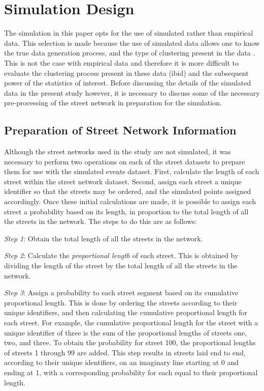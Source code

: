 \documentclass[12pt, letterpaper]{article}
\begin{document}
\section{Simulation Design}
The simulation in this paper opts for the use of simulated rather than empirical data. This selection is made because the use of simulated data allows one to know the true data generation process, and the type of clustering present in the data  \citep{kulldorff2006cancer}. This is not the case with empirical data and therefore it is more difficult to evaluate the clustering process present in these data (ibid) and the subsequent power of the statistics of interest. Before discussing the details of the simulated data in the present study however, it is necessary to discuss some of the necessary pre-processing of the street network in preparation for the simulation.

\subsection{Preparation of Street Network Information}
Although the street networks used in the study are not simulated, it was necessary to perform two operations on each of the street datasets to prepare them for use with the simulated events dataset. First, calculate the length of each street within the street network dataset. Second, assign each street a unique identifier so that the streets may be ordered, and the simulated points assigned accordingly. Once these initial calculations are made, it is possible to assign each street a probability based on its length, in proportion to the total length of all the streets in the network. The steps to do this are as follows:

\emph{Step 1}: Obtain the total length of all the streets in the network.

\emph{Step 2}: Calculate the \emph{proportional length} of each street. This is obtained by dividing the length of the street by the total length of all the streets in the network.

\emph{Step 3}: Assign a probability to each street segment based on its cumulative proportional length. This is done by ordering the streets according to their unique identifiers, and then calculating the cumulative proportional length for each street. For example, the cumulative proportional length for the street with a unique identifier of three is the sum of the proportional lengths of streets one, two, and three. To obtain the probability for street 100, the proportional lengths of streets 1 through 99 are added. This step results in streets laid end to end, according to their unique identifiers, on an imaginary line starting at 0 and ending at 1, with a corresponding probability for each equal to their proportional length.
\end{document}
